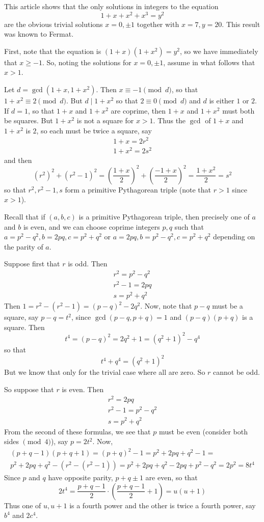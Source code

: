 \documentclass[12pt]{article}
\begin{document}
This article shows that the only solutions in integers to the equation
\[1+x+x^2+x^3=y^2\]
are the obvious trivial solutions $x=0,\pm 1$ together with $x=7, y=20$. This result was known to Fermat.

First, note that the equation is $(1+x)(1+x^2)=y^2$, so we have immediately that $x\ge -1$. So, noting the solutions for $x=0,\pm 1$, assume in what follows that $x>1$.

Let $d=\gcd(1+x,1+x^2)$. Then $x\equiv -1\pmod d$, so that $1+x^2\equiv 2\pmod d$. But $d\mid 1+x^2$ so that $2\equiv 0\pmod d$ and $d$ is either $1$ or $2$. If $d=1$, so that $1+x$ and $1+x^2$ are coprime, then $1+x$ and $1+x^2$ must both be squares. But $1+x^2$ is not a square for $x>1$. Thus the $\gcd$ of $1+x$ and $1+x^2$ is $2$, so each must be twice a square, say
\begin{gather*}
1+x=2r^2\\
1+x^2=2s^2
\end{gather*}
and then
\[(r^2)^2+(r^2-1)^2=\left(\frac{1+x}{2}\right)^2+\left(\frac{-1+x}{2}\right)^2=\frac{1+x^2}{2}=s^2\]
so that $r^2, r^2-1, s$ form a primitive Pythagorean triple (note that $r>1$ since $x>1$).

Recall that if $(a,b,c)$ is a primitive Pythagorean triple, then precisely one of $a$ and $b$ is even, and we can choose coprime integers $p,q$ such that $a=p^2-q^2, b=2pq, c=p^2+q^2$ or $a=2pq, b=p^2-q^2, c=p^2+q^2$ depending on the parity of $a$.

Suppose first that $r$ is odd. Then
\begin{gather*}
r^2=p^2-q^2\\
r^2-1=2pq\\
s=p^2+q^2
\end{gather*}
Then $1=r^2-(r^2-1)=(p-q)^2-2q^2$. Now, note that $p-q$ must be a square, say $p-q=t^2$, since $\gcd(p-q,p+q)=1$ and $(p-q)(p+q)$ is a square. Then
\[t^4=(p-q)^2=2q^2+1=(q^2+1)^2-q^4\]
so that
\[t^4+q^4=(q^2+1)^2\]
But we know that  only for the trivial case where all are zero. So $r$ cannot be odd.

So suppose that $r$ is even. Then
\begin{gather*}
r^2=2pq\\
r^2-1=p^2-q^2\\
s=p^2+q^2
\end{gather*}
From the second of these formulas, we see that $p$ must be even (consider both sides $\pmod 4$), say $p=2t^2$. Now,
\begin{multline*}(p+q-1)(p+q+1)=(p+q)^2-1=p^2+2pq+q^2-1=\\
p^2+2pq+q^2-(r^2-(r^2-1))=p^2+2pq+q^2-2pq+p^2-q^2=2p^2=8t^4
\end{multline*}
Since $p$ and $q$ have opposite parity, $p+q\pm 1$ are even, so that
\[2t^4=\frac{p+q-1}{2}\cdot\left(\frac{p+q-1}{2}+1\right)=u(u+1)\]
Thus one of $u,u+1$ is a fourth power and the other is twice a fourth power, say $b^4$ and $2c^4$.
\end{document}
